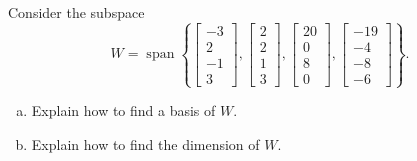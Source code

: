 
\begin{exerciseStatement}


Consider the subspace \[W=\operatorname{span}  \left\{ \left[\begin{array}{c}
-3 \\
2 \\
-1 \\
3
\end{array}\right] , \left[\begin{array}{c}
2 \\
2 \\
1 \\
3
\end{array}\right] , \left[\begin{array}{c}
20 \\
0 \\
8 \\
0
\end{array}\right] , \left[\begin{array}{c}
-19 \\
-4 \\
-8 \\
-6
\end{array}\right] \right\} .\]


\begin{enumerate}[(a)]
\item  Explain how to find a basis of \(W\).
\item  Explain how to find the dimension of \(W\).
\end{enumerate}
    
\end{exerciseStatement}
    
